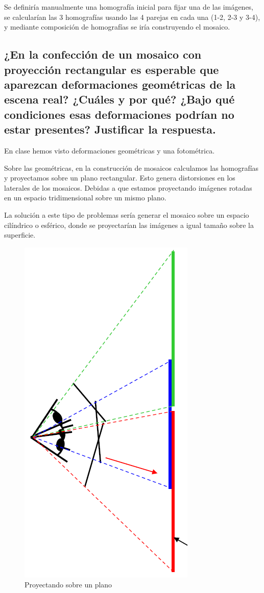 \documentclass[11pt]{scrartcl} %
\begin{document}
Se definiría manualmente una homografía inicial para fijar una de las 
imágenes, se calcularían las 3 homografías usando las 4 parejas en cada una
(1-2, 2-3 y 3-4), 
y mediante composición de homografías se iría construyendo el mosaico.




\subsection{¿En la confección de un mosaico con proyección rectangular es
esperable que aparezcan deformaciones geométricas de la escena
real? ¿Cuáles y por qué? ¿Bajo qué condiciones esas deformaciones
podrían no estar presentes? Justificar la respuesta.}


En clase hemos visto deformaciones geométricas y una fotométrica.

Sobre las geométricas, en la construcción de mosaicos calculamos las homografías 
y proyectamos sobre un plano rectangular. 
Esto genera distorsiones en los laterales de los mosaicos.
Debidas a que estamos proyectando imágenes rotadas en un espacio 
tridimensional sobre un mismo plano. \newline

La solución a este tipo de problemas sería generar el mosaico sobre un espacio
cilíndrico o esférico, donde se proyectarían las imágenes a igual tamaño sobre 
la superficie. \newline

\begin{figure}[h]
	\centering
	\includegraphics[width=0.2\columnwidth]{3.png}
	\caption{Proyectando sobre un plano}
\end{figure}
\end{document}
